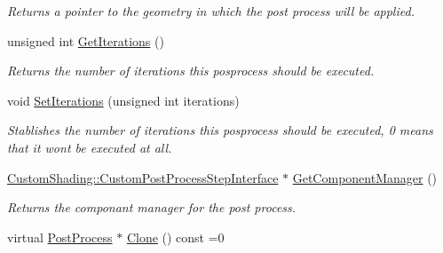\begin{DoxyCompactItemize}
\begin{DoxyCompactList}\small\item\em Returns a pointer to the geometry in which the post process will be applied. \end{DoxyCompactList}\item 
\mbox{\label{class_geometry_engine_1_1_geometry_post_process_1_1_post_process_a9a84b9dfb65f32e926fa2e70c89353da}} 
unsigned int \mbox{\hyperlink{class_geometry_engine_1_1_geometry_post_process_1_1_post_process_a9a84b9dfb65f32e926fa2e70c89353da}{Get\+Iterations}} ()
\begin{DoxyCompactList}\small\item\em Returns the number of iterations this posprocess should be executed. \end{DoxyCompactList}\item 
\mbox{\label{class_geometry_engine_1_1_geometry_post_process_1_1_post_process_aae74c0e24364b7cbe2cf64f2ce88258c}} 
void \mbox{\hyperlink{class_geometry_engine_1_1_geometry_post_process_1_1_post_process_aae74c0e24364b7cbe2cf64f2ce88258c}{Set\+Iterations}} (unsigned int iterations)
\begin{DoxyCompactList}\small\item\em Stablishes the number of iterations this posprocess should be executed, 0 means that it won\textquotesingle{}t be executed at all. \end{DoxyCompactList}\item 
\mbox{\label{class_geometry_engine_1_1_geometry_post_process_1_1_post_process_a6819c90dc9a1343ab25765bfba373507}} 
\mbox{\hyperlink{class_geometry_engine_1_1_custom_shading_1_1_custom_post_process_step_interface}{Custom\+Shading\+::\+Custom\+Post\+Process\+Step\+Interface}} $\ast$ \mbox{\hyperlink{class_geometry_engine_1_1_geometry_post_process_1_1_post_process_a6819c90dc9a1343ab25765bfba373507}{Get\+Component\+Manager}} ()
\begin{DoxyCompactList}\small\item\em Returns the componant manager for the post process. \end{DoxyCompactList}\item 
virtual \mbox{\hyperlink{class_geometry_engine_1_1_geometry_post_process_1_1_post_process}{Post\+Process}} $\ast$ \mbox{\hyperlink{class_geometry_engine_1_1_geometry_post_process_1_1_post_process_aa80749cf09041335f6b3bda3aaf31711}{Clone}} () const =0
\end{DoxyCompactItemize}
